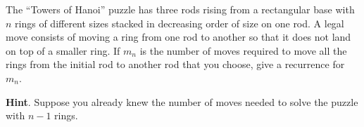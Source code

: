 \documentclass{book}
\begin{document}
\setcounter{cpjt}{137}
\addtocounter{cpjt}{-1}
\begin{activity}\label{HanoiProblem}
\hypertarget{p-898}{}%
The ``Towers of Hanoi'' puzzle has three rods rising from a rectangular base with \(n\) rings of different sizes stacked in decreasing order of size on one rod. A legal move consists of moving a ring from one rod to another so that it does not land on top of a smaller ring. If \(m_n\) is the number of moves required to move all the rings from the initial rod to another rod that you choose, give a recurrence for \(m_n\).%
\par\smallskip%
\noindent\textbf{Hint}.\hypertarget{hint-95}{}\quad%
\hypertarget{p-899}{}%
Suppose you already knew the number of moves needed to solve the puzzle with \(n-1\) rings.%
\par\smallskip%
\noindent\end{activity}

\clearpage
\end{document}
